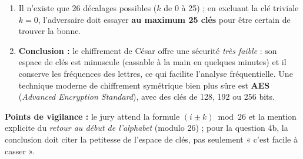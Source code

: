 \documentclass[11pt]{article}
\begin{document}
\begin{corrige}
\begin{enumerate}
\begin{enumerate}
\item Il n'existe que 26 décalages possibles ($k$ de 0 à 25) ; en excluant la clé triviale $k = 0$, l'adversaire doit essayer \textbf{au maximum 25 clés} pour être certain de trouver la bonne.
\item \textbf{Conclusion :} le chiffrement de César offre une sécurité \emph{très faible} : son espace de clés est minuscule (cassable à la main en quelques minutes) et il conserve les fréquences des lettres, ce qui facilite l'analyse fréquentielle. Une technique moderne de chiffrement symétrique bien plus sûre est \textbf{AES} (\emph{Advanced Encryption Standard}), avec des clés de 128, 192 ou 256 bits.
\end{enumerate}
\end{enumerate}
\textbf{Points de vigilance :} le jury attend la formule $(i \pm k) \bmod 26$ et la mention explicite du \emph{retour au début de l'alphabet} (modulo 26) ; pour la question 4b, la conclusion doit citer la petitesse de l'espace de clés, pas seulement « c'est facile à casser ».
\end{corrige}
\end{document}
